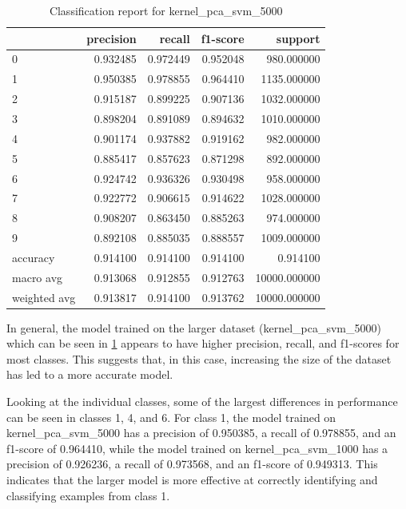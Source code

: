 \begin{table}[htb!]
    \centering
    \caption{Classification report for kernel_pca_svm_5000}
    \label{tab:classification-report-kernel_pca_svm_5000}
    \begin{tabular}{lrrrr}
        \toprule
        & precision & recall & f1-score & support \\
        \midrule
        0 & 0.932485 & 0.972449 & 0.952048 & 980.000000 \\
        1 & 0.950385 & 0.978855 & 0.964410 & 1135.000000 \\
        2 & 0.915187 & 0.899225 & 0.907136 & 1032.000000 \\
        3 & 0.898204 & 0.891089 & 0.894632 & 1010.000000 \\
        4 & 0.901174 & 0.937882 & 0.919162 & 982.000000 \\
        5 & 0.885417 & 0.857623 & 0.871298 & 892.000000 \\
        6 & 0.924742 & 0.936326 & 0.930498 & 958.000000 \\
        7 & 0.922772 & 0.906615 & 0.914622 & 1028.000000 \\
    8 & 0.908207 & 0.863450 & 0.885263 & 974.000000 \\
    9 & 0.892108 & 0.885035 & 0.888557 & 1009.000000 \\
    accuracy & 0.914100 & 0.914100 & 0.914100 & 0.914100 \\
    macro avg & 0.913068 & 0.912855 & 0.912763 & 10000.000000 \\
    weighted avg & 0.913817 & 0.914100 & 0.913762 & 10000.000000 \\
    \bottomrule
\end{tabular}
\end{table}

In general, the model trained on the larger dataset (kernel_pca_svm_5000) which can be seen in \ref{tab:classification-report-kernel_pca_svm_5000} appears to have higher precision, recall, and f1-scores for most classes. This suggests that, in this case, increasing the size of the dataset has led to a more accurate model.

Looking at the individual classes, some of the largest differences in performance can be seen in classes 1, 4, and 6. For class 1, the model trained on kernel_pca_svm_5000 has a precision of 0.950385, a recall of 0.978855, and an f1-score of 0.964410, while the model trained on kernel_pca_svm_1000 has a precision of 0.926236, a recall of 0.973568, and an f1-score of 0.949313. This indicates that the larger model is more effective at correctly identifying and classifying examples from class 1.

